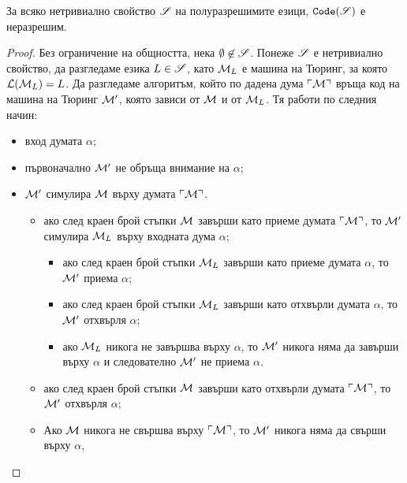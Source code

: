 \begin{important}
  \begin{theorem}
    За всяко нетривиално свойство $\mathscr{S}$ на полуразрешимите езици,
    $\texttt{Code}(\mathscr{S})$ е неразрешим.
  \end{theorem}
\end{important}
\begin{proof}
  Без ограничение на общността, нека $\emptyset \not\in \mathscr{S}$.
  Понеже $\mathscr{S}$ е нетривиално свойство, да разгледаме езика $L \in \mathscr{S}$,
  като $\mathcal{M}_L$ е машина на Тюринг, за която $\mathcal{L}(\mathcal{M}_L) = L$.
  Да разгледаме алгоритъм, който по дадена дума $\ulcorner{\mathcal{M}}\urcorner$
  връща код на машина на Тюринг $\mathcal{M}'$, която зависи от $\mathcal{M}$ и от $\mathcal{M}_L$.
  Тя работи по следния начин:
  \begin{itemize}
  \item
    вход думата $\alpha$;
  \item
    първоначално $\mathcal{M}'$ не обръща внимание на $\alpha$;
  \item
    $\mathcal{M}'$ симулира $\mathcal{M}$ върху думата $\ulcorner{\mathcal{M}}\urcorner$.
    \begin{itemize}
    \item
      ако след краен брой стъпки $\mathcal{M}$ завърши като приеме думата $\ulcorner{\mathcal{M}}\urcorner$, то 
      $\mathcal{M}'$ симулира $\mathcal{M}_L$ върху входната дума $\alpha$;
      \begin{itemize}
      \item
        ако след краен брой стъпки $\mathcal{M}_L$ завърши като приеме думата $\alpha$, то 
        $\mathcal{M}'$ приема $\alpha$;
      \item 
        ако след краен брой стъпки $\mathcal{M}_L$ завърши като отхвърли думата $\alpha$, то 
        $\mathcal{M}'$ отхвърля $\alpha$;
      \item
        ако $\mathcal{M}_L$ никога не завършва върху $\alpha$, то 
        $\mathcal{M}'$ никога няма да завърши върху $\alpha$ и следователно $\mathcal{M}'$
        не приема $\alpha$.
      \end{itemize}
    \item
      ако след краен брой стъпки $\mathcal{M}$ завърши като отхвърли думата $\ulcorner{\mathcal{M}}\urcorner$, то 
      $\mathcal{M}'$ отхвърля $\alpha$;
    \item
      Ако $\mathcal{M}$ никога не свършва върху $\ulcorner{\mathcal{M}}\urcorner$, то $\mathcal{M}'$ никога няма да свърши върху $\alpha$,

\end{itemize}
\end{itemize}
\end{proof}
